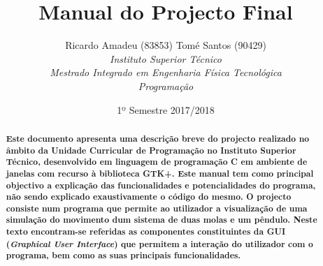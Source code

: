 \documentclass[a4paper]{article}
\begin{document}
\renewcommand\thesubsection{\Alpha.{subsection}}

\title{\bf\LARGE{\vspace{-19mm} Manual do Projecto Final}\vspace{-1.5mm}}
\author{{ {Ricardo Amadeu (83853)} {Tomé Santos (90429)}} \vspace{1mm}\\\textit{\small{Instituto Superior Técnico}}\vspace{-1mm}\\ \textit{\small{Mestrado Integrado em Engenharia Física Tecnológica}}\vspace{-1mm}
\\ \textit{\small{Programação}}\vspace{-1mm}
\date{\normalsize{1º Semestre 2017/2018}}}

\maketitle

\vspace{-6mm}
\renewcommand{\abstractname}{Resumo}
\begin{abstract} \vspace{-1mm}

\par \bf Este documento apresenta uma descrição breve do projecto realizado no âmbito da Unidade Curricular de Programação no Instituto Superior Técnico, desenvolvido em linguagem de programação C em ambiente de janelas com recurso à biblioteca GTK+. Este manual tem como principal objectivo a explicação das funcionalidades e potencialidades do programa, não sendo explicado exaustivamente o código do mesmo. O projecto consiste num programa que permite ao utilizador a visualização de uma simulação do movimento dum sistema de duas molas e um pêndulo. Neste texto encontram-se referidas as componentes constituintes da GUI (\textit{Graphical User Interface}) que permitem a interação do utilizador com o programa, bem como as suas principais funcionalidades.

\end{abstract}

\vspace{2mm}
\end{document}
